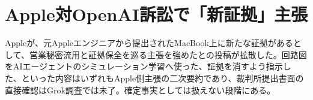 \section{Apple対OpenAI訴訟で「新証拠」主張}
Appleが、元Appleエンジニアから提出されたMacBook上に新たな証拠があるとして、営業秘密流用と証拠保全を巡る主張を強めたとの投稿が拡散した。回路図をAIエージェントのシミュレーション学習へ使った、証拠を消すよう指示した、といった内容はいずれもApple側主張の二次要約であり、裁判所提出書面の直接確認はGrok調査では未了。確定事実としては扱えない段階にある。
